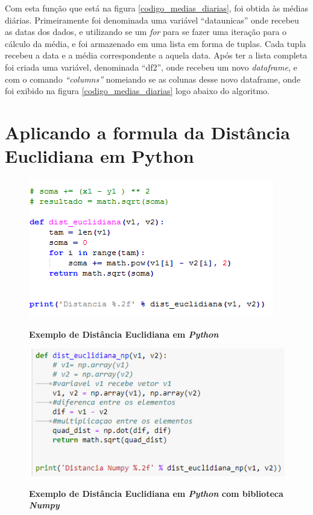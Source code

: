 \par Com esta função que está na figura \ref{codigo_medias_diarias}, foi obtida às médias diárias. Primeiramente foi denominada uma variável “dataunicas” onde recebeu as datas dos dados, e utilizando se um \emph{for} para se fazer uma iteração para o cálculo da média, e foi armazenado em uma lista em forma de tuplas. Cada tupla recebeu a data e a média correspondente a aquela data. Após ter a lista completa foi criada uma variável, denominada “df2”, onde recebeu um novo \emph{dataframe}, e com o comando \emph{“columns”} nomeiando se as colunas desse novo dataframe, onde foi exibido na figura \ref{codigo_medias_diarias} logo abaixo do algoritmo.


\section{Aplicando a formula da Distância Euclidiana em Python}

\begin{figure}[ht]
	\caption{\textbf{Exemplo de Distância Euclidiana em \emph{Python}}}
	\centering
		\includegraphics[scale=1, keepaspectratio]{figuras/codigodistanciaeuclidianaempython}
		\label{dist_eu_py}
\end{figure}

\begin{figure}[h]
	\caption{\textbf{Exemplo de Distância Euclidiana em \emph{Python} com biblioteca \emph{Numpy}}}
	\centering
		\includegraphics[scale=1, keepaspectratio]{figuras/codigodistanciaeuclidianaempythonnumpy}
		\label{dist_eu_pynumpy}
\end{figure}

